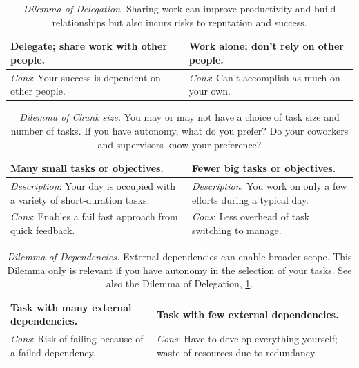 \begin{center}
\begin{table}[H] %
\begin{tabular}{ | m{\dilemmatablewidth}| m{\dilemmatablewidth} | } 
  \hline
  \textbf{Delegate; share work with other people.} & 
  \textbf{Work alone; don't rely on other people.} \\ 
  \hline
  \textit{Cons}: Your success is dependent on other people. & 
  \textit{Cons}: Can't accomplish as much on your own. \\  
  \hline
\end{tabular}
\caption{\textit{Dilemma of Delegation.}
Sharing work can improve productivity and build relationships but also incurs risks to reputation and success.
}
\label{table:delegate-or-not}
\end{table}
\end{center}

\begin{center}
\begin{table}[H] %
\begin{tabular}{ | m{\dilemmatablewidth}| m{\dilemmatablewidth} | } 
  \hline
  \textbf{Many small tasks or objectives.} & 
  \textbf{Fewer big tasks or objectives.} \\ 
  \hline
  \textit{Description}: Your day is occupied with a variety of short-duration tasks. & 
  \textit{Description}: You work on only a few efforts during a typical day. \\  
    \hline
  \textit{Cons}: Enables a fail fast approach from quick feedback. & 
  \textit{Cons}: Less overhead of task switching to manage. \\
  \hline
\end{tabular}
\caption{\textit{Dilemma of Chunk size.}
You may or may not have a choice of task size and number of tasks. If you have autonomy, what do you prefer? Do your coworkers and supervisors know your preference? 
}
\label{table:chunk_size}
\end{table}
\end{center}

\begin{center}
\begin{table}[H] %
\begin{tabular}{ | m{\dilemmatablewidth}| m{\dilemmatablewidth} | } 
  \hline
  \textbf{Task with many external dependencies.} & 
  \textbf{Task with few external dependencies.} \\ 
  \hline
  \textit{Cons}: Risk of failing because of a failed dependency. & 
  \textit{Cons}: Have to develop everything yourself; waste of resources due to redundancy. \\  
  \hline
\end{tabular}
\caption{\textit{Dilemma of Dependencies.}
External dependencies can enable broader scope. This Dilemma only is relevant if you have autonomy in the selection of your tasks. See also the Dilemma of Delegation, \ref{table:delegate-or-not}.
}
\label{table:number_of_external dependencies}
\end{table}
\end{center}

